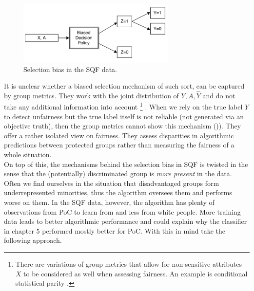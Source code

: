 \begin{figure}
    \includegraphics[width=0.7\textwidth]{../figures/selection_bias.png}
    \caption{Selection bias in the SQF data.}
    \label{fig:selection_bias}
\end{figure}

It is unclear whether a biased selection mechanism of such sort, can be captured by group metrics. They work with the joint distribution of $Y, A, \hat{Y}$ and do not take any additional information into account \footnote{There are variations of group metrics that allow for non-sensitive attributes $X$ to be considered as well when assessing fairness. An example is conditional statistical parity \cite{verma2018}.} . When we rely on the true label $Y$ to detect unfairness but the true label itself is not reliable (not generated via an objective truth), then the group metrics cannot show this mechanism ()\cite{castelnovo2022}). They offer a rather isolated view on fairness. They assess disparities in algorithmic predictions between protected groups rather than measuring the fairness of a whole situation.\\
On top of this, the mechanisms behind the selection bias in SQF is twisted in the sense that the (potentially) discriminated group is \textit{more present} in the data. Often we find ourselves in the situation that disadvantaged groups form underrepresented minorities, thus the algorithm oversees them and performs worse on them. In the SQF data, however, the algorithm has plenty of observations from PoC to learn from and less from white people. More training data leads to better algorithmic performance and could explain why the classifier in chapter 5 performed mostly better for PoC. With this in mind \cite{kallus2018} take the following approach.\\



